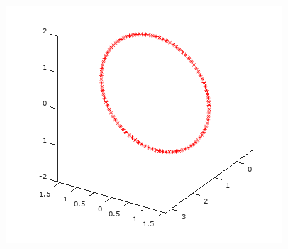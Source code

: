 \documentclass[12pt]{article}
\begin{document}
\begin{minipage}{\textwidth}
\begin{figure}[H]
			\includegraphics[scale=0.5]{primer6_4} 
		\end{figure}
	\end{minipage}
	
\end{document}
